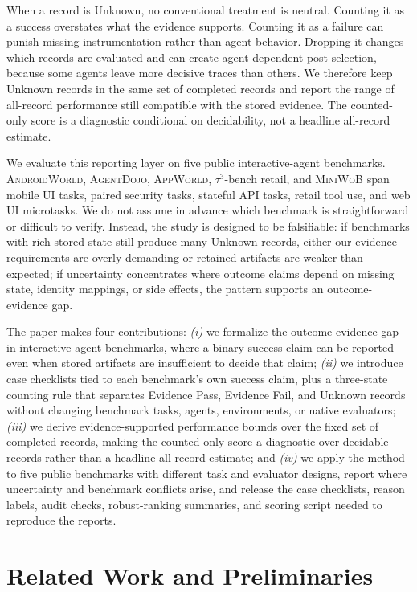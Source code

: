 \documentclass{article}
\newcommand{\agentdojo}{\textsc{AgentDojo}\xspace}
\newcommand{\appworld}{\textsc{AppWorld}\xspace}
\newcommand{\tauthree}{\(\tau^3\)-bench retail\xspace}
\newcommand{\androidworld}{\textsc{AndroidWorld}\xspace}
\newcommand{\miniwob}{\textsc{MiniWoB}\xspace}
\newcommand{\evidencePass}{Evidence Pass\xspace}
\newcommand{\evidenceFail}{Evidence Fail\xspace}
\newcommand{\unknownLabel}{Unknown\xspace}
\begin{document}
When a record is Unknown, no conventional treatment is neutral. Counting it
as a success overstates what the evidence supports. Counting it as a failure
can punish missing instrumentation rather than agent behavior. Dropping it
changes which records are evaluated and can create agent-dependent
post-selection, because some agents leave more decisive traces than others. We
therefore keep Unknown records in the same set of completed records and
report the range of all-record performance still compatible with the stored
evidence. The counted-only score is a diagnostic conditional on decidability,
not a headline all-record estimate.

We evaluate this reporting layer on five public interactive-agent benchmarks.
\androidworld, \agentdojo, \appworld, \tauthree, and \miniwob span mobile UI
tasks, paired security tasks, stateful API tasks, retail tool use, and web UI
microtasks. We do not assume in advance which benchmark is straightforward or
difficult to verify. Instead, the study is designed to be falsifiable: if
benchmarks with rich stored state still produce many Unknown records, either
our evidence requirements are overly demanding or retained artifacts are weaker
than expected; if uncertainty concentrates where outcome claims depend
on missing state, identity mappings, or side effects, the pattern supports an
outcome-evidence gap.

The paper makes four contributions: \textit{(i)} we formalize the
outcome-evidence gap in interactive-agent benchmarks, where a binary success
claim can be reported even when stored artifacts are insufficient to decide
that claim; \textit{(ii)} we introduce case checklists tied to
each benchmark's own success claim, plus a three-state counting rule that
separates \evidencePass, \evidenceFail, and \unknownLabel records
without changing benchmark tasks, agents, environments, or native evaluators;
\textit{(iii)} we derive evidence-supported performance bounds over the fixed
set of completed records, making the counted-only score a diagnostic over
decidable records rather than a headline all-record estimate; and
\textit{(iv)} we apply the method to five public benchmarks with different
task and evaluator designs, report where uncertainty and benchmark conflicts arise,
and release the case checklists, reason labels, audit checks, robust-ranking
summaries, and scoring script needed to reproduce the reports.

\section{Related Work and Preliminaries}
\label{sec:related-prelim}
\end{document}
